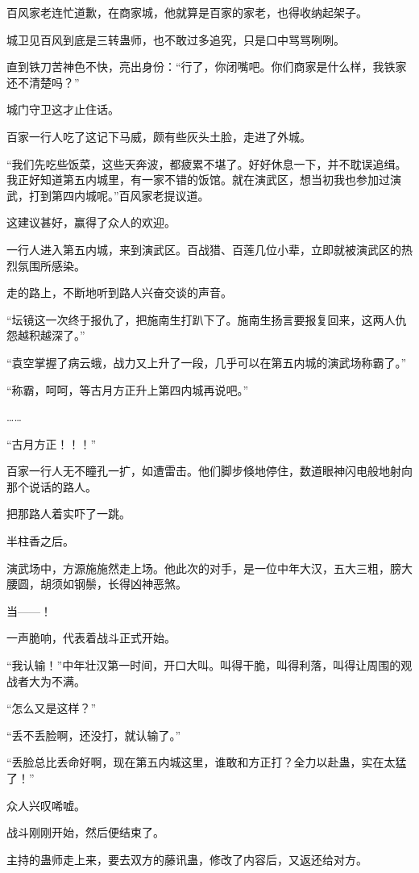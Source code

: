 \begin{this_body}
百风家老连忙道歉，在商家城，他就算是百家的家老，也得收纳起架子。

城卫见百风到底是三转蛊师，也不敢过多追究，只是口中骂骂咧咧。

直到铁刀苦神色不快，亮出身份：“行了，你闭嘴吧。你们商家是什么样，我铁家还不清楚吗？”

城门守卫这才止住话。

百家一行人吃了这记下马威，颇有些灰头土脸，走进了外城。

“我们先吃些饭菜，这些天奔波，都疲累不堪了。好好休息一下，并不耽误追缉。我正好知道第五内城里，有一家不错的饭馆。就在演武区，想当初我也参加过演武，打到第四内城呢。”百风家老提议道。

这建议甚好，赢得了众人的欢迎。

一行人进入第五内城，来到演武区。百战猎、百莲几位小辈，立即就被演武区的热烈氛围所感染。

走的路上，不断地听到路人兴奋交谈的声音。

“坛镜这一次终于报仇了，把施南生打趴下了。施南生扬言要报复回来，这两人仇怨越积越深了。”

“袁空掌握了病云蛾，战力又上升了一段，几乎可以在第五内城的演武场称霸了。”

“称霸，呵呵，等古月方正升上第四内城再说吧。”

……

“古月方正！！！”

百家一行人无不瞳孔一扩，如遭雷击。他们脚步倏地停住，数道眼神闪电般地射向那个说话的路人。

把那路人着实吓了一跳。

半柱香之后。

演武场中，方源施施然走上场。他此次的对手，是一位中年大汉，五大三粗，膀大腰圆，胡须如钢鬃，长得凶神恶煞。

当——！

一声脆响，代表着战斗正式开始。

“我认输！”中年壮汉第一时间，开口大叫。叫得干脆，叫得利落，叫得让周围的观战者大为不满。

“怎么又是这样？”

“丢不丢脸啊，还没打，就认输了。”

“丢脸总比丢命好啊，现在第五内城这里，谁敢和方正打？全力以赴蛊，实在太猛了！”

众人兴叹唏嘘。

战斗刚刚开始，然后便结束了。

主持的蛊师走上来，要去双方的藤讯蛊，修改了内容后，又返还给对方。


\end{this_body}
